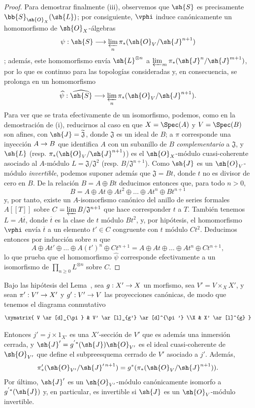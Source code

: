 \documentclass[oneside,10pt]{amsart}
\makeatletter
\renewcommand{\geq}{\geqslant}
\newcommand{\ega@arrow}[2]{\mathchoice{#1}{#2}{#2}{#2}}
\renewcommand{\to}{\ega@arrow{\longrightarrow}{\rightarrow}}
\newcommand{\oldpage}[2][]{\marginnote{\normalfont\footnotesize\textbf{#1}~|~#2}\ignorespaces}
\let\EGAOriginalLabel\label
\renewcommand{\label}[1]{\phantomsection\EGAOriginalLabel{#1}}
\makeatother
\begin{document}
\begin{proof}
Para demostrar finalmente (iii), observemos que $\sh{S}$ es precisamente $\bb{S}_{\sh{O}_X}(\sh{L})$;
por consiguiente, $\vphi$ induce canónicamente un homomorfismo de $\sh{O}_X$-álgebras
\[
  \psi:\sh{S}\longrightarrow
  \varprojlim_n\pi_*(\sh{O}_V/\sh{J}^{n+1})
\]
;
además, este homomorfismo envía $\sh{L}^{\otimes n}$ a $\varprojlim_m\pi_*(\sh{J}^n/\sh{J}^{m+1})$, por lo que es continuo para las topologías consideradas y, en consecuencia, se prolonga en un homomorfismo
\[
  \widehat{\psi}:\widehat{\sh{S}}\longrightarrow
  \varprojlim_n\pi_*(\sh{O}_V/\sh{J}^{n+1}).
\]
Para ver que se trata efectivamente de un isomorfismo, podemos, como en la demostración de (i), reducirnos al caso en que $X=\Spec(A)$ y $V=\Spec(B)$ son afines, con $\sh{J}=\widetilde{\mathfrak{J}}$, donde $\mathfrak{J}$ es un ideal de $B$;
a $\pi$ corresponde una inyección $A\to B$ que identifica $A$ con un subanillo de $B$ \emph{complementario} a $\mathfrak{J}$, y $\sh{L}$ (resp. $\pi_*(\sh{O}_V/\sh{J}^{n+1})$) es el $\sh{O}_X$-módulo cuasi-coherente asociado al $A$-módulo $L=\mathfrak{J}/\mathfrak{J}^2$ (resp. $B/\mathfrak{J}^{n+1}$).
Como $\sh{J}$ es un $\sh{O}_V$-módulo \emph{invertible}, podemos suponer además que $\mathfrak{J}=Bt$, donde $t$ no es divisor de cero en $B$.
De la relación $B=A\oplus Bt$ deducimos entonces que, para todo $n>0$,
\[
  B=A\oplus At\oplus At^2\oplus\ldots\oplus At^n\oplus Bt^{n+1}
\]
y, por tanto, existe un $A$-isomorfismo canónico del anillo de series formales $A[[T]]$ sobre $C=\varprojlim B/\mathfrak{J}^{n+1}$ que hace corresponder $t$ a $T$.
También tenemos $L=A\overline{t}$, donde $\overline{t}$ es la clase de $t$ módulo $Bt^2$, y, por hipótesis, el homomorfismo $\vphi$ envía $\overline{t}$ a un elemento $t'\in C$ congruente con $t$ módulo $Ct^2$.
Deducimos entonces por inducción sobre $n$ que
\[
  A\oplus At'\oplus\ldots\oplus A(t')^n\oplus Ct^{n+1}
  =A\oplus At\oplus\ldots\oplus At^n\oplus Ct^{n+1},
\]
lo que prueba que el homomorfismo $\widehat{\psi}$ corresponde efectivamente a un isomorfismo de $\prod_{n\geq0}L^{\otimes n}$ sobre $C$.
\end{proof}

\begin{lemma}[8.10.2]
\label{II.8.10.2}
Bajo las hipótesis del Lema~, sea $g:X'\to X$ un morfismo,
\oldpage[II]{186}
sea $V'=V\times_X X'$, y sean $\pi':V'\to X'$ y $g':V'\to V$ las proyecciones canónicas, de modo que tenemos el diagrama conmutativo
\[
  \xymatrix{
    V
      \ar[d]_{\pi}
  & V'
      \ar[l]_{g'}
      \ar[d]^{\pi'}
  \\X
  & X'
      \ar[l]^{g}
  }
\]

Entonces $j'=j\times1_{X'}$ es una $X'$-sección de $V'$ que es además una inmersión cerrada, y $\sh{J}'=g^{'*}(\sh{J})\sh{O}_{V'}$ es el ideal cuasi-coherente de $\sh{O}_{V'}$ que define el subpreesquema cerrado de $V'$ asociado a $j'$.
Además,
\[
  \pi'_*(\sh{O}_{V'}/\sh{J}'^{\,n+1})
  =g^*(\pi_*(\sh{O}_V/\sh{J}^{n+1})).
\]
Por último, $\sh{J}'$ es un $\sh{O}_{V'}$-módulo canónicamente isomorfo a $g^{'*}(\sh{J})$ y, en particular, es invertible si $\sh{J}$ es un $\sh{O}_V$-módulo invertible.
\end{lemma}
\end{document}
